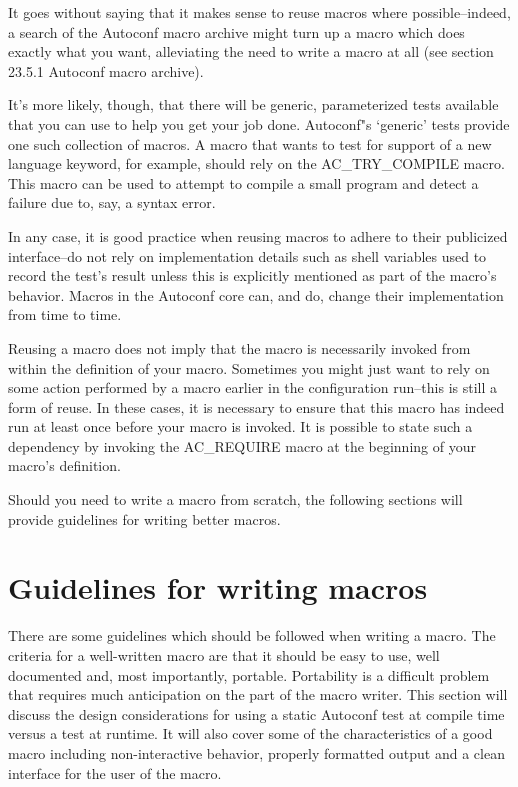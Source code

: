 It goes without saying that it makes sense to reuse macros where possible--indeed, a search of the Autoconf macro archive might turn up a macro which does exactly what you want, alleviating the need to write a macro at all (see section 23.5.1 Autoconf macro archive).

It's more likely, though, that there will be generic, parameterized tests available that you can use to help you get your job done. Autoconf"s `generic' tests provide one such collection of macros. A macro that wants to test for support of a new language keyword, for example, should rely on the AC\_{}TRY\_{}COMPILE macro. This macro can be used to attempt to compile a small program and detect a failure due to, say, a syntax error.

In any case, it is good practice when reusing macros to adhere to their publicized interface--do not rely on implementation details such as shell variables used to record the test's result unless this is explicitly mentioned as part of the macro's behavior. Macros in the Autoconf core can, and do, change their implementation from time to time.

Reusing a macro does not imply that the macro is necessarily invoked from within the definition of your macro. Sometimes you might just want to rely on some action performed by a macro earlier in the configuration run--this is still a form of reuse. In these cases, it is necessary to ensure that this macro has indeed run at least once before your macro is invoked. It is possible to state such a dependency by invoking the AC\_{}REQUIRE macro at the beginning of your macro's definition.

Should you need to write a macro from scratch, the following sections will provide guidelines for writing better macros. 

\section{Guidelines for writing macros}

There are some guidelines which should be followed when writing a macro. The criteria for a well-written macro are that it should be easy to use, well documented and, most importantly, portable. Portability is a difficult problem that requires much anticipation on the part of the macro writer. This section will discuss the design considerations for using a static Autoconf test at compile time versus a test at runtime. It will also cover some of the characteristics of a good macro including non-interactive behavior, properly formatted output and a clean interface for the user of the macro. 


